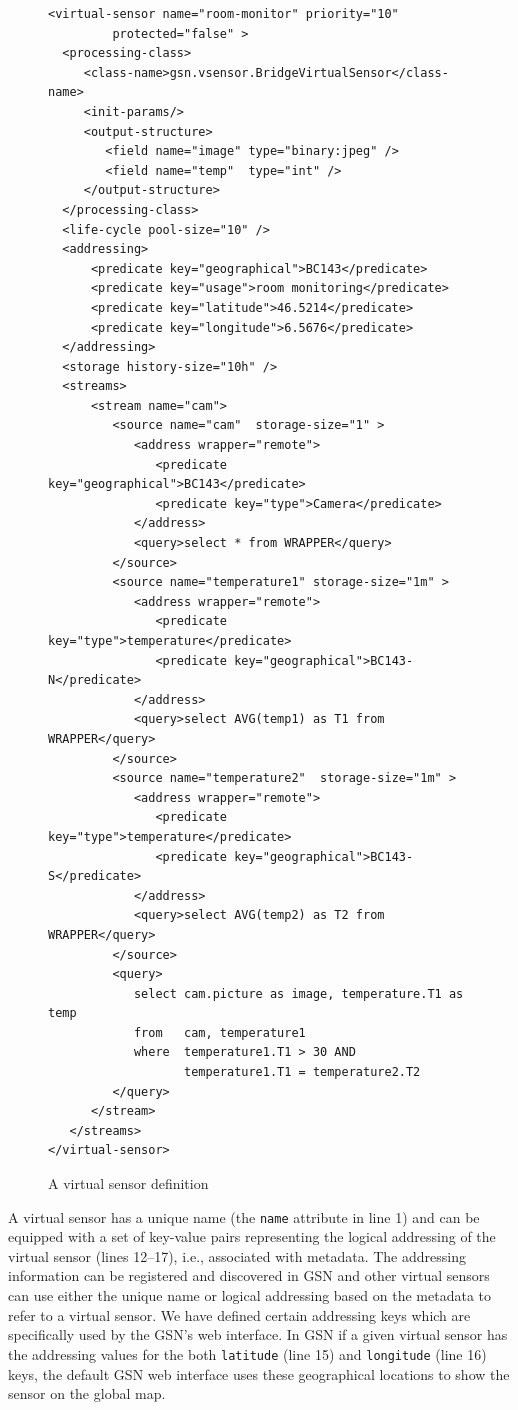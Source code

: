 \begin{figure}%
  \centering
  \lstset{numbers=left, numberstyle=\footnotesize}
\begin{lstlisting}
<virtual-sensor name="room-monitor" priority="10" 
         protected="false" >
  <processing-class>
     <class-name>gsn.vsensor.BridgeVirtualSensor</class-name>
     <init-params/>
     <output-structure>
        <field name="image" type="binary:jpeg" />
        <field name="temp"  type="int" />
     </output-structure>
  </processing-class>
  <life-cycle pool-size="10" />
  <addressing>
      <predicate key="geographical">BC143</predicate>
      <predicate key="usage">room monitoring</predicate>
      <predicate key="latitude">46.5214</predicate>
      <predicate key="longitude">6.5676</predicate>
  </addressing>
  <storage history-size="10h" />
  <streams>
      <stream name="cam">
         <source name="cam"  storage-size="1" >
            <address wrapper="remote">
               <predicate key="geographical">BC143</predicate>
               <predicate key="type">Camera</predicate>
            </address>
            <query>select * from WRAPPER</query>
         </source>
         <source name="temperature1" storage-size="1m" >
            <address wrapper="remote">
               <predicate key="type">temperature</predicate>
               <predicate key="geographical">BC143-N</predicate>
            </address>
            <query>select AVG(temp1) as T1 from WRAPPER</query>
         </source>
         <source name="temperature2"  storage-size="1m" >
            <address wrapper="remote">
               <predicate key="type">temperature</predicate>
               <predicate key="geographical">BC143-S</predicate>
            </address>
            <query>select AVG(temp2) as T2 from WRAPPER</query>
         </source>
         <query>
            select cam.picture as image, temperature.T1 as temp
            from   cam, temperature1
            where  temperature1.T1 > 30 AND
                   temperature1.T1 = temperature2.T2
         </query>
      </stream>
   </streams>
</virtual-sensor>
\end{lstlisting}
  \caption{A virtual sensor definition}
  \label{fig:ComplexVS}
\end{figure}

A virtual sensor has a unique name (the \verb|name| attribute in line 1) and
can be equipped with a set of key-value pairs representing the logical addressing of the
virtual sensor (lines 12--17), i.e., associated with metadata. The addressing information can be registered and
discovered in GSN and other virtual sensors can use either the unique name or
logical addressing based on the metadata to refer to a virtual sensor. 
We have defined certain addressing keys which are specifically used by the GSN's web interface. In GSN if a given
virtual sensor has the addressing values for the both \texttt{latitude} (line 15) and \texttt{longitude} (line 16) keys, the default GSN
web interface uses these geographical locations to show the sensor on the global map.

